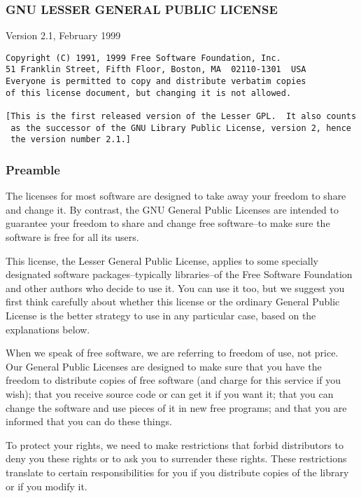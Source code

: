 \documentclass[]{article}
\date{}
\begin{document}
\subsubsection{GNU LESSER GENERAL PUBLIC LICENSE}

Version 2.1, February 1999

\begin{verbatim}
Copyright (C) 1991, 1999 Free Software Foundation, Inc.
51 Franklin Street, Fifth Floor, Boston, MA  02110-1301  USA
Everyone is permitted to copy and distribute verbatim copies
of this license document, but changing it is not allowed.

[This is the first released version of the Lesser GPL.  It also counts
 as the successor of the GNU Library Public License, version 2, hence
 the version number 2.1.]
\end{verbatim}

\subsubsection{Preamble}

The licenses for most software are designed to take away your freedom to
share and change it. By contrast, the GNU General Public Licenses are
intended to guarantee your freedom to share and change free software--to
make sure the software is free for all its users.

This license, the Lesser General Public License, applies to some
specially designated software packages--typically libraries--of the Free
Software Foundation and other authors who decide to use it. You can use
it too, but we suggest you first think carefully about whether this
license or the ordinary General Public License is the better strategy to
use in any particular case, based on the explanations below.

When we speak of free software, we are referring to freedom of use, not
price. Our General Public Licenses are designed to make sure that you
have the freedom to distribute copies of free software (and charge for
this service if you wish); that you receive source code or can get it if
you want it; that you can change the software and use pieces of it in
new free programs; and that you are informed that you can do these
things.

To protect your rights, we need to make restrictions that forbid
distributors to deny you these rights or to ask you to surrender these
rights. These restrictions translate to certain responsibilities for you
if you distribute copies of the library or if you modify it.
\end{document}
